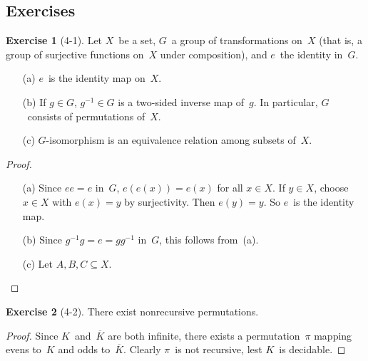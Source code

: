 \documentclass[letterpaper]{article}
\newcommand{\iso}{\equiv}
\newcommand{\comp}[1]{\overline{#1}}
\theoremstyle{definition}
\newtheorem*{exer}{Exercise}
\theoremstyle{remark}
\theoremstyle{direction}
\begin{document}
\subsection*{Exercises}
\begin{exer}[4-1]
Let $X$~be a set, $G$~a group of transformations on~$X$ (that is, a group of surjective functions on~$X$ under composition), and $e$~the identity in~$G$.
\begin{enumerate}[itemsep=0pt]
\item[(a)] $e$~is the identity map on~$X$.
\item[(b)] If $g\in G$, $g^{-1}\in G$ is a two-sided inverse map of~$g$. In particular, $G$~consists of permutations of~$X$.
\item[(c)] $G$-isomorphism is an equivalence relation among subsets of~$X$.
\end{enumerate}
\end{exer}
\begin{proof}
\begin{enumerate}[itemsep=0pt]
\item[(a)] Since $ee=e$ in~$G$, $e(e(x))=e(x)$ for all $x\in X$. If $y\in X$, choose $x\in X$ with $e(x)=y$ by surjectivity. Then $e(y)=y$. So $e$~is the identity map.

\item[(b)] Since $g^{-1}g=e=gg^{-1}$ in~$G$, this follows from~(a).

\item[(c)] Let $A,B,C\subseteq X$.
\end{enumerate}
\end{proof}

\begin{exer}[4-2]
There exist nonrecursive permutations.
\end{exer}
\begin{proof}
Since $K$~and~$\comp{K}$ are both infinite, there exists a permutation~$\pi$ mapping evens to~$K$ and odds to~$\comp{K}$. Clearly $\pi$~is not recursive, lest $K$~is decidable.
\end{proof}
\end{document}
